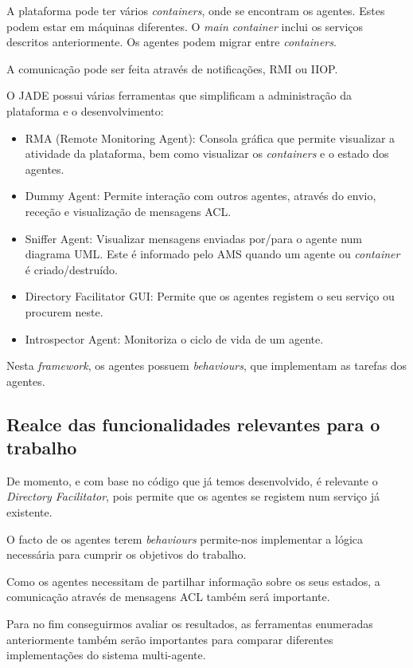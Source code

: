 \documentclass[a4paper]{article}
\begin{document}
A plataforma pode ter vários \textit{containers}, onde se encontram os agentes. Estes podem estar em máquinas diferentes. O \textit{main container} inclui os serviços descritos anteriormente. Os agentes podem migrar entre \textit{containers}.

A comunicação pode ser feita através de notificações, RMI ou IIOP. 

O JADE possui várias ferramentas que simplificam a administração da plataforma e o desenvolvimento:

\begin{itemize}
\item RMA (Remote Monitoring Agent): Consola gráfica que permite visualizar a atividade da plataforma, bem como visualizar os \textit{containers} e o estado dos agentes.
\item Dummy Agent: Permite interação com outros agentes, através do envio, receção e visualização de mensagens ACL.
\item Sniffer Agent: Visualizar mensagens enviadas por/para o agente num diagrama UML. Este é informado pelo AMS quando um agente ou \textit{container} é criado/destruído.
\item Directory Facilitator GUI: Permite que os agentes registem o seu serviço ou procurem neste.
\item Introspector Agent: Monitoriza o ciclo de vida de um agente.
\end{itemize}

Nesta \textit{framework}, os agentes possuem \textit{behaviours}, que implementam as tarefas dos agentes.

\subsection{Realce das funcionalidades relevantes para o trabalho} 

De momento, e com base no código que já temos desenvolvido, é relevante o \textit{Directory Facilitator}, pois permite que os agentes se registem num serviço já existente.

O facto de os agentes terem \textit{behaviours} permite-nos implementar a lógica necessária para cumprir os objetivos do trabalho.

Como os agentes necessitam de partilhar informação sobre os seus estados, a comunicação através de mensagens ACL também será importante.

Para no fim conseguirmos avaliar os resultados, as ferramentas enumeradas anteriormente também serão importantes para comparar diferentes implementações do sistema multi-agente.
\end{document}
